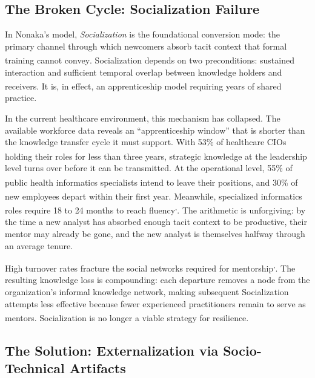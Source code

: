 \documentclass[
  american,
  11pt,
  letterpaper,
  oneside  ,captions=tableheading
]{scrartcl}
\begin{document}
\subsection{The Broken Cycle: Socialization
Failure}\label{the-broken-cycle-socialization-failure}

In Nonaka's model, \emph{Socialization} is the foundational conversion
mode: the primary channel through which newcomers absorb tacit context
that formal training cannot
convey\textsuperscript{}. Socialization
depends on two preconditions: sustained interaction and sufficient
temporal overlap between knowledge holders and
receivers\textsuperscript{}. It is, in
effect, an apprenticeship model requiring years of shared practice.

In the current healthcare environment, this mechanism has collapsed. The
available workforce data reveals an ``apprenticeship window'' that is
shorter than the knowledge transfer cycle it must support. With 53\% of
healthcare CIOs holding their roles for less than three
years\textsuperscript{}, strategic
knowledge at the leadership level turns over before it can be
transmitted. At the operational level, 55\% of public health informatics
specialists intend to leave their
positions\textsuperscript{}, and 30\% of
new employees depart within their first
year\textsuperscript{}. Meanwhile, specialized
informatics roles require 18 to 24 months to reach
fluency\textsuperscript{,}.
The arithmetic is unforgiving: by the time a new analyst has absorbed
enough tacit context to be productive, their mentor may already be gone,
and the new analyst is themselves halfway through an average tenure.

High turnover rates fracture the social networks required for
mentorship\textsuperscript{,}.
The resulting knowledge loss is compounding: each departure removes a
node from the organization's informal knowledge network, making
subsequent Socialization attempts less effective because fewer
experienced practitioners remain to serve as
mentors\textsuperscript{}.
Socialization is no longer a viable strategy for resilience.

\subsection{The Solution: Externalization via Socio-Technical
Artifacts}\label{the-solution-externalization-via-socio-technical-artifacts}
\end{document}
